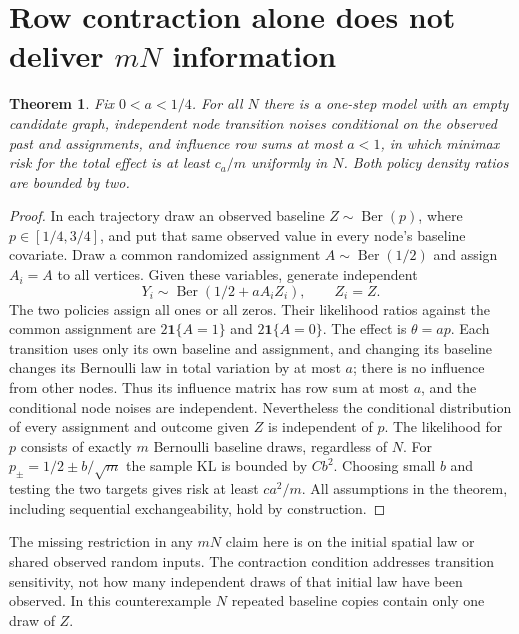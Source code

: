 \documentclass[11pt]{article}
\newtheorem{theorem}{Theorem}
\theoremstyle{definition}
\begin{document}
\section*{Row contraction alone does not deliver $mN$ information}
\begin{theorem}
Fix $0<a<1/4$. For all $N$ there is a one-step model with an empty
candidate graph, independent node transition noises conditional on the
observed past and assignments, and influence row sums at most $a<1$,
in which minimax risk for the total effect is at least $c_a/m$ uniformly
in $N$. Both policy density ratios are bounded by two.
\end{theorem}
\begin{proof}
In each trajectory draw an observed baseline $Z\sim\operatorname{Ber}(p)$,
where $p\in[1/4,3/4]$, and put that same observed value in every node's
baseline covariate. Draw a common randomized assignment $A\sim
\operatorname{Ber}(1/2)$ and assign $A_i=A$ to all vertices.
Given these variables, generate independent
\[
 Y_i\sim\operatorname{Ber}(1/2+a A_i Z_i),\qquad Z_i=Z.
\]
The two policies assign all ones or all zeros. Their likelihood ratios
against the common assignment are $2\mathbf1\{A=1\}$ and
$2\mathbf1\{A=0\}$. The effect is $\theta=ap$.
Each transition uses only its own baseline and assignment, and changing
its baseline changes its Bernoulli law in total variation by at most $a$;
there is no influence from other nodes. Thus its influence matrix has
row sum at most $a$, and the conditional node noises are independent.
Nevertheless the conditional distribution of every assignment and outcome
given $Z$ is independent of $p$. The likelihood for $p$ consists of exactly
$m$ Bernoulli baseline draws, regardless of $N$.
For $p_\pm=1/2\pm b/\sqrt m$ the sample KL is bounded by $Cb^2$.
Choosing small $b$ and testing the two targets gives risk at least
$c a^2/m$. All assumptions in the theorem, including sequential
exchangeability, hold by construction.
\end{proof}
The missing restriction in any $mN$ claim here is on the initial spatial
law or shared observed random inputs. The contraction condition addresses
transition sensitivity, not how many independent draws of that initial
law have been observed. In this counterexample $N$ repeated baseline
copies contain only one draw of $Z$.
\end{document}
